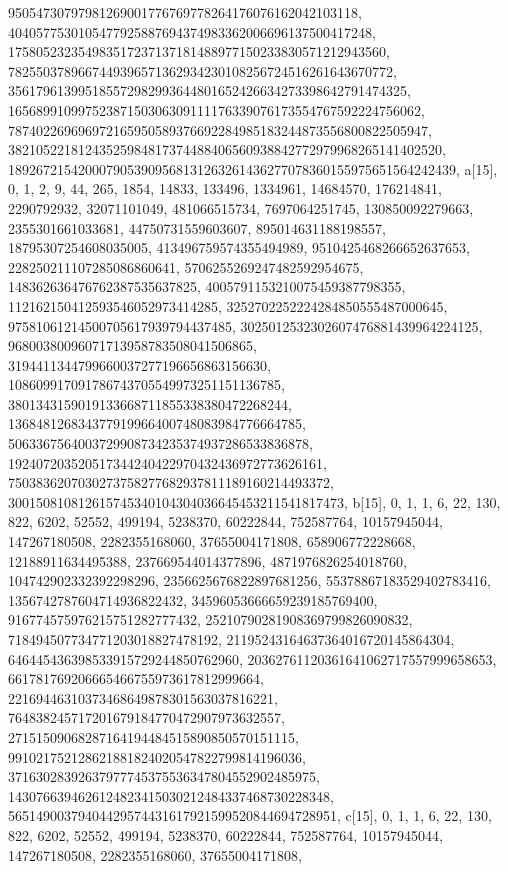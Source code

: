 {{{   95054730797981269001776769778264176076162042103118, 
   4040577530105477925887694374983362006696137500417248, 
   175805232354983517237137181488977150233830571212943560, 
   7825503789667449396571362934230108256724516261643670772, 
   356179613995185572982993644801652426634273398642791474325, 
   16568991099752387150306309111176339076173554767592224756062, 
   787402269696972165950589376692284985183244873556800822505947, 
   38210522181243525984817374488406560938842772979968265141402520, 
   1892672154200079053909568131263261436277078360155975651564242439}}, 
 {a[15], {0, 1, 2, 9, 44, 265, 1854, 14833, 133496, 1334961, 14684570, 
   176214841, 2290792932, 32071101049, 481066515734, 7697064251745, 
   130850092279663, 2355301661033681, 44750731559603607, 895014631188198557, 
   18795307254608035005, 413496759574355494989, 9510425468266652637653, 
   228250211107285086860641, 5706255269247482592954675, 
   148362636476762387535637825, 4005791153210075459387798355, 
   112162150412593546052973414285, 3252702252224284850555487000645, 
   97581061214500705617939794437485, 3025012532302607476881439964224125, 
   96800380096071713958783508041506865, 
   3194411344799660037277196656863156630, 
   108609917091786743705549973251151136785, 
   3801343159019133668711855338380472268244, 
   136848126834377919966400748083984776664785, 
   5063367564003729908734235374937286533836878, 
   192407203520517344240422970432436972773626161, 
   7503836207030273758277682937811189160214493372, 
   300150810812615745340104304036645453211541817473}}, 
 {b[15], {0, 1, 1, 6, 22, 130, 822, 6202, 52552, 499194, 5238370, 60222844, 
   752587764, 10157945044, 147267180508, 2282355168060, 37655004171808, 
   658906772228668, 12188911634495388, 237669544014377896, 
   4871976826254018760, 104742902332392298296, 2356625676822897681256, 
   55378867183529402783416, 1356742787604714936822432, 
   34596053666659239185769400, 916774575976215751282777432, 
   25210790281908369799826090832, 718494507734771203018827478192, 
   21195243164637364016720145864304, 646445436398533915729244850762960, 
   20362761120361641062717557999658653, 661781769206665466755973617812999664, 
   22169446310373468649878301563037816221, 
   764838245717201679184770472907973632557, 
   27151509068287164194484515890850570151115, 
   991021752128621881824020547822799814196036, 
   37163028392637977745375536347804552902485975, 
   1430766394626124823415030212484337468730228348, 
   56514900379404429574431617921599520844694728951}}, 
 {c[15], {0, 1, 1, 6, 22, 130, 822, 6202, 52552, 499194, 5238370, 60222844, 
   752587764, 10157945044, 147267180508, 2282355168060, 37655004171808, 
}}}
